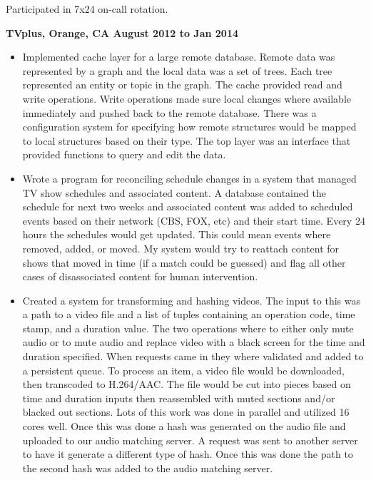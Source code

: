 \documentclass{res}
\begin{document}
\begin{resume}
\begin{itemize}
    	Participated in 7x24 on-call rotation.

\end{itemize}

{\large \bf TVplus, Orange, CA \hfill August 2012 to Jan 2014}

\begin{itemize}

\item
	Implemented cache layer for a large remote database.  Remote
	data was represented by a graph and the local data was a
	set of trees.  Each tree represented an entity or topic in
	the graph.  The cache provided read and write operations.  Write
	operations made sure local changes where available immediately and
	pushed back to the remote database.  There was a configuration
	system for specifying how remote structures would be mapped
	to local structures based on their type.  The top layer was an
	interface that provided functions to query and edit the data.

\item
	Wrote a program for reconciling schedule changes in a system
	that managed TV show schedules and associated content.	A database
	contained the schedule for next two weeks and associated content
	was added to scheduled events based on their network (CBS, FOX,
	etc) and their start time.  Every 24 hours the schedules would
	get updated.  This could mean events where removed, added,
	or moved.  My system would try to reattach content for shows
	that moved in time (if a match could be guessed) and flag all
	other cases of disassociated content for human intervention.
\item
	Created a system for transforming and hashing videos.  The
	input to this was a path to a video file and a list of tuples
	containing an operation code, time stamp, and a duration value.
	The two operations where to either only mute audio or to mute
	audio and replace video with a black screen for the time and
	duration specified.  When requests came in they where validated
	and added to a persistent queue.  To process an item, a video
	file would be downloaded, then transcoded to H.264/AAC.  The file
	would be cut into pieces based on time and duration inputs then
	reassembled with muted sections and/or blacked out sections.
	Lots of this work was done in parallel and utilized 16 cores well.
	Once this was done a hash was generated on the audio file and
	uploaded to our audio matching server.	A request was sent to
	another server to have it generate a different type of hash.
	Once this was done the path to the second hash was added to the
	audio matching server.


\end{itemize}
\end{resume}
\end{document}
